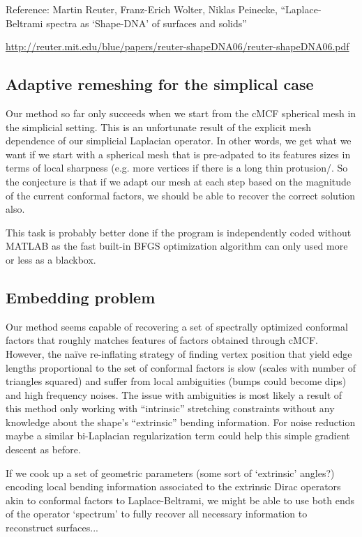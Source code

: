 \documentclass[11pt]{article}
\theoremstyle{definition}
\begin{document}
Reference: Martin Reuter, Franz-Erich Wolter, Niklas Peinecke, ``Laplace-Beltrami spectra as `Shape-DNA' of surfaces and solids''

\url{http://reuter.mit.edu/blue/papers/reuter-shapeDNA06/reuter-shapeDNA06.pdf}

\subsection{Adaptive remeshing for the simplical case}
Our method so far only succeeds when we start from the cMCF spherical mesh in the simplicial setting. This is an unfortunate result of the explicit mesh dependence of our simplicial Laplacian operator. In other words, we get what we want if we start with a spherical mesh that is pre-adpated to its features sizes in terms of local sharpness (e.g. more vertices if there is a long thin protusion/. So the conjecture is that if we adapt our mesh at each step based on the magnitude of the current conformal factors, we should be able to recover the correct solution also.

This task is probably better done if the program is independently coded without MATLAB as the fast built-in BFGS optimization algorithm can only used more or less as a blackbox.

\subsection{Embedding problem}
\label{embed}
Our method seems capable of recovering a set of spectrally optimized conformal factors that roughly matches features of factors obtained through cMCF. However, the na\"ive re-inflating strategy of finding vertex position that yield edge lengths proportional to the set of conformal factors is slow (scales with number of triangles squared) and suffer from local ambiguities (bumps could become dips) and high frequency noises. The issue with ambiguities is most likely a result of this method only working with ``intrinsic'' stretching constraints without any knowledge about the shape's ``extrinsic'' bending information. For noise reduction maybe a similar bi-Laplacian regularization term could help this simple gradient descent as before.

If we cook up a set of geometric parameters (some sort of `extrinsic' angles?) encoding local bending information associated to the extrinsic Dirac operators akin to conformal factors to Laplace-Beltrami, we might be able to use both ends of the operator `spectrum' to fully recover all necessary information to reconstruct surfaces...
\end{document}
